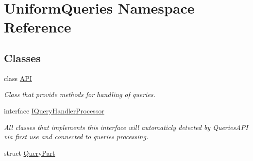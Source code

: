 \hypertarget{namespace_uniform_queries}{}\section{Uniform\+Queries Namespace Reference}
\label{namespace_uniform_queries}
\subsection*{Classes}
\begin{DoxyCompactItemize}
\item 
class \mbox{\hyperlink{class_uniform_queries_1_1_a_p_i}{A\+PI}}
\begin{DoxyCompactList}\small\item\em Class that provide methods for handling of queries. \end{DoxyCompactList}\item 
interface \mbox{\hyperlink{interface_uniform_queries_1_1_i_query_handler_processor}{I\+Query\+Handler\+Processor}}
\begin{DoxyCompactList}\small\item\em All classes that implements this interface will automaticly detected by Queries\+A\+PI via first use and connected to queries processing. \end{DoxyCompactList}\item 
struct \mbox{\hyperlink{struct_uniform_queries_1_1_query_part}{Query\+Part}}
\end{DoxyCompactItemize}
